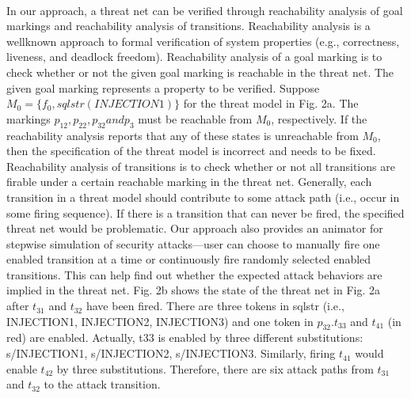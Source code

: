 \paragraph{}
In our approach, a threat net can be verified through reachability analysis of goal markings and reachability analysis of transitions. Reachability analysis is a wellknown approach to formal verification of system properties (e.g., correctness, liveness, and deadlock freedom). Reachability analysis of a goal marking is to check whether or not the given goal marking is reachable in the threat net.
The given goal marking represents a property to be verified. Suppose $M_0 = \{ f_0, sqlstr(INJECTION1)\}$ for the threat model in Fig. 2a. The markings $p_{12},p_{22},p_{32} and p_3$ must be reachable from $M_0$, respectively. If the reachability analysis reports that any of these states is unreachable from $M_0$, then the specification of the threat model is incorrect and needs to be fixed. Reachability analysis of transitions is to check whether or not all transitions are firable under a
certain reachable marking in the threat net. Generally, each transition in a threat model should contribute to some attack path (i.e., occur in some firing sequence). If there is a transition that can never be fired, the specified threat net
would be problematic. Our approach also provides an animator for stepwise simulation of security attacks—user can choose to manually fire one enabled transition at a time or continuously fire randomly selected enabled transitions.
This can help find out whether the expected attack behaviors are implied in the threat net. Fig. 2b shows the state of the threat net in Fig. 2a after $t_{31}$ and $t_{32}$ have been fired. There are three tokens in sqlstr (i.e., INJECTION1,
INJECTION2, INJECTION3) and one token in $p_{32}.t_{33}$ and $t_{41}$ (in red) are enabled. Actually, t33 is enabled by three different substitutions: s/INJECTION1, s/INJECTION2, s/INJECTION3. Similarly, firing $t_{41}$ would enable $t_{42}$ by
three substitutions. Therefore, there are six attack paths
from $t_{31}$ and $t_{32}$ to the attack transition.
